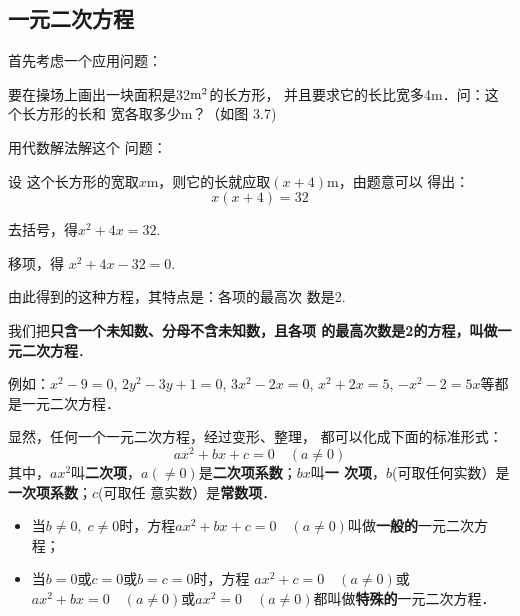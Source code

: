 \subsection{一元二次方程}
首先考虑一个应用问题：

要在操场上画出一块面积是32${\rm m}^2$的长方形，
并且要求它的长比宽多4m．问：这个长方形的长和
宽各取多少m？（如图
3.7)
\begin{figure}[htp]
    \centering
    \caption{}
\end{figure}


用代数解法解这个
问题：

设 这个长方形的宽取$x$m，则它的长就应取$(x+4)$m，由题意可以
得出：
\[x(x+4)=32\]

去括号，得$x^2+4x=32$.

移项，得 $x^2+4x-32=0$.

由此得到的这种方程，其特点是：各项的最高次
数是2.

我们把\textbf{只含一个未知数、分母不含未知数，且各项
的最高次数是2的方程，叫做一元二次方程}．

例如：$x^2-9=0$, $2y^2-3y+1=0$, $3x^2-2x=0$,
$x^2+2x=5$, $-x^2-2=5x$等都是一元二次方程．

显然，任何一个一元二次方程，经过变形、整理，
都可以化成下面的标准形式：
\[ax^2+bx+c=0\quad (a\ne 0)\]
其中，$ax^2$叫\textbf{二次项}，$a(\ne 0)$是\textbf{二次项系数}；$bx$叫\textbf{一
次项}，$b$(可取任何实数）是\textbf{一次项系数}；$c$(可取任
意实数）是\textbf{常数项}．
\begin{itemize}
    \item 当$b\ne 0,\; c\ne 0$时，方程$ax^2+bx+c=0\quad (a\ne 0)$叫做\textbf{一般的}一元二次方程；
    \item 当$b=0$或$c=0$或$b=c=0$时，方程
$ax^2+c=0\quad (a\ne 0)$或$ax^2+bx=0\quad (a\ne 0)$或$ax^2=0\quad (a\ne 
0)$都叫做\textbf{特殊的}一元二次方程．
\end{itemize}

